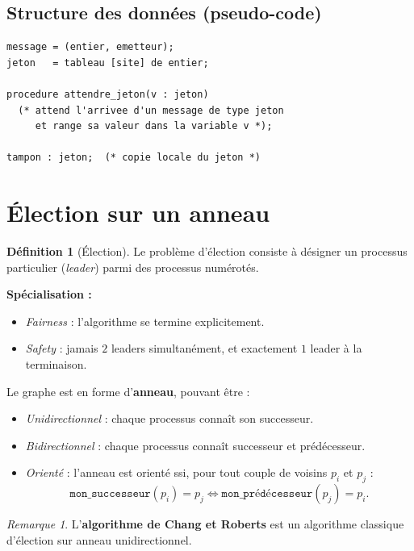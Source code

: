 \documentclass[12pt,a4paper]{article}
\theoremstyle{definition}
\newtheorem{definition}{Définition}[section]
\theoremstyle{plain}
\theoremstyle{remark}
\newtheorem{remarque}{Remarque}[section]
\begin{document}
\subsection{Structure des données (pseudo-code)}

\begin{lstlisting}[caption={Déclarations pour l'algorithme R.A. avec jeton}]
message = (entier, emetteur);
jeton   = tableau [site] de entier;

procedure attendre_jeton(v : jeton)
  (* attend l'arrivee d'un message de type jeton
     et range sa valeur dans la variable v *);

tampon : jeton;  (* copie locale du jeton *)
\end{lstlisting}

\section{Élection sur un anneau}

\begin{definition}[Élection]
  Le problème d'élection consiste à désigner un processus particulier
  (\emph{leader}) parmi des processus numérotés.
\end{definition}

\textbf{Spécialisation :}
\begin{itemize}
  \item \emph{Fairness} : l'algorithme se termine explicitement.
  \item \emph{Safety} : jamais $2$ leaders simultanément, et exactement $1$ leader
        à la terminaison.
\end{itemize}

Le graphe est en forme d'\textbf{anneau}, pouvant être :
\begin{itemize}
  \item \emph{Unidirectionnel} : chaque processus connaît son successeur.
  \item \emph{Bidirectionnel} : chaque processus connaît successeur et prédécesseur.
  \item \emph{Orienté} : l'anneau est orienté ssi, pour tout couple de voisins
        $p_i$ et $p_j$ :
        \[
          \texttt{mon\_successeur}(p_i) = p_j
          \iff
          \texttt{mon\_prédécesseur}(p_j) = p_i.
        \]
\end{itemize}

\begin{remarque}
  L'\textbf{algorithme de Chang et Roberts} est un algorithme classique d'élection
  sur anneau unidirectionnel.
\end{remarque}
\end{document}
